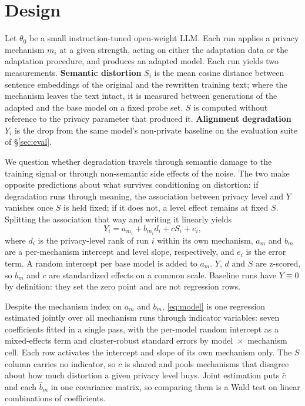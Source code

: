 \section{\label{sec:design}Design}
Let $\theta_0$ be a small instruction-tuned open-weight LLM.
Each run applies a privacy mechanism $m_i$ at a given strength,
acting on either the adaptation data or the adaptation procedure,
and produces an adapted model.
Each run yields two measurements.
\textbf{Semantic distortion} $S_i$ is the mean cosine distance between sentence embeddings of the original and the rewritten training text;
where the mechanism leaves the text intact,
it is measured between generations of the adapted and the base model on a fixed probe set.
$S$ is computed without reference to the privacy parameter that produced it.
\textbf{Alignment degradation} $Y_i$ is the drop from the same model's non-private baseline on the evaluation suite of \S\ref{sec:eval}.

We question whether degradation travels through semantic damage to the training signal or through non-semantic side effects of the noise.
The two make opposite predictions about what survives conditioning on distortion:
if degradation runs through meaning,
the association between privacy level and $Y$ vanishes once $S$ is held fixed;
if it does not,
a level effect remains at fixed $S$.
Splitting the association that way and writing it linearly yields
\begin{equation}
  Y_i = a_{m_i} + b_{m_i} d_i + c S_i + e_i,
  \label{eq:model}
\end{equation}
where $d_i$ is the privacy-level rank of run $i$ within its own mechanism,
$a_m$ and $b_m$ are a per-mechanism intercept and level slope,
respectively,
and $e_i$ is the error term.
A random intercept per base model is added to $a_m$.
$Y$,
$d$ and $S$ are z-scored,
so $b_m$ and $c$ are standardized effects on a common scale.
Baseline runs have $Y \equiv 0$ by definition:
they set the zero point and are not regression rows.

Despite the mechanism index on $a_m$ and $b_m$,
\eqref{eq:model} is one regression estimated jointly over all mechanism runs through indicator variables:
seven coefficients fitted in a single pass,
with the per-model random intercept as a mixed-effects term and cluster-robust standard errors by model~$\times$~mechanism cell.
Each row activates the intercept and slope of its own mechanism only.
The $S$ column carries no indicator,
so $c$ is shared and pools mechanisms that disagree about how much distortion a given privacy level buys.
Joint estimation puts $\hat c$ and each $\hat b_m$ in one covariance matrix,
so comparing them is a Wald test on linear combinations of coefficients.

